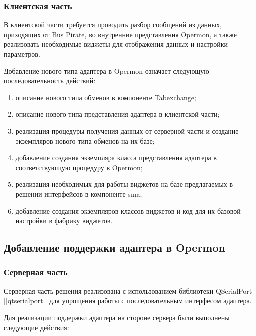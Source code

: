 \subsubsection*{Клиентская часть}

В клиентской части требуется проводить разбор сообщений из данных, приходящих от Bus Pirate, во внутренние представления Opermon, а также реализовать необходимые виджеты для отображения данных и настройки параметров. 

Добавление нового типа адаптера в Opermon означает следующую последовательность действий:

\begin{enumerate}
 \item описание нового типа обменов в компоненте Tabexchange;
 \item описание нового типа представления адаптера в клиентской части;
 \item реализация процедуры получения данных от серверной части и создание экземпляров нового типа обменов на их базе;
 \item добавление создания экземпляра класса представления адаптера в соответствующую процедуру в Opermon;
 \item реализация необходимых для работы виджетов на базе предлагаемых в решении интерфейсов в компоненте sma;
 \item добавление создания экземпляров классов виджетов и код для их базовой настройки в фабрику виджетов.
\end{enumerate}


\subsection{Добавление поддержки адаптера в Opermon}

\subsubsection*{Серверная часть}

\label{server_implementation}

Серверная часть решения реализована с использованием библиотеки QSerialPort [\ref{qtserialport}] для упрощения работы с последовательным интерфесом адаптера.

Для реализации поддержки адаптера на стороне сервера были выполнены следующие действия:

